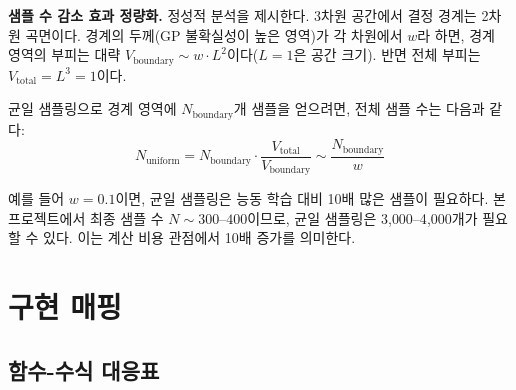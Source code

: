 \documentclass[11pt]{article}
\begin{document}
\textbf{샘플 수 감소 효과 정량화.} 정성적 분석을 제시한다. 3차원 공간에서 결정 경계는 2차원 곡면이다. 경계의 두께(GP 불확실성이 높은 영역)가 각 차원에서 $w$라 하면, 경계 영역의 부피는 대략 $V_{\text{boundary}} \sim w \cdot L^2$이다($L = 1$은 공간 크기). 반면 전체 부피는 $V_{\text{total}} = L^3 = 1$이다.

균일 샘플링으로 경계 영역에 $N_{\text{boundary}}$개 샘플을 얻으려면, 전체 샘플 수는 다음과 같다:
\begin{equation}\label{eq:sample-reduction}
N_{\text{uniform}} = N_{\text{boundary}} \cdot \frac{V_{\text{total}}}{V_{\text{boundary}}} \sim \frac{N_{\text{boundary}}}{w}
\end{equation}

예를 들어 $w = 0.1$이면, 균일 샘플링은 능동 학습 대비 10배 많은 샘플이 필요하다. 본 프로젝트에서 최종 샘플 수 $N \sim 300$--$400$이므로, 균일 샘플링은 3{,}000--4{,}000개가 필요할 수 있다. 이는 계산 비용 관점에서 10배 증가를 의미한다.


\section{구현 매핑}

\subsection{함수-수식 대응표}
\end{document}
